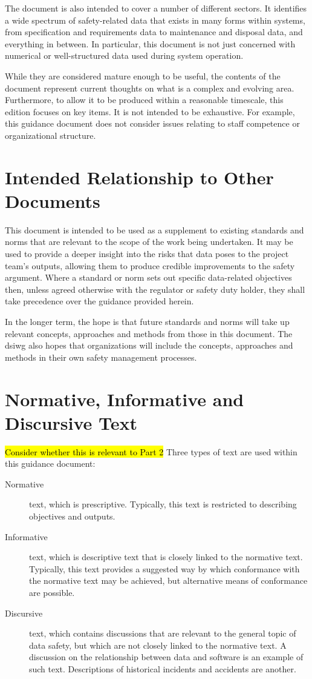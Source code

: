 The document is also intended to cover a number of different sectors. It identifies a wide spectrum of safety-related data that exists in many forms within systems, from specification and requirements data to maintenance and disposal data, and everything in between. In particular, this document is not just concerned with numerical or well-structured data used during system operation.

While they are considered mature enough to be useful, the contents of the document represent current thoughts on what is a complex and evolving area. Furthermore, to allow it to be produced within a reasonable timescale, this edition focuses on key items. It is not intended to be exhaustive. For example, this guidance document does not consider issues relating to staff competence or organizational structure.

\section{Intended Relationship to Other Documents}
This document is intended to be used as a supplement to existing standards and norms that are relevant to the scope of the work being undertaken. It may be used to provide a deeper insight into the risks that data poses to the project team's outputs, allowing them to produce credible improvements to the safety argument. Where a standard or norm sets out specific data-related objectives then, unless agreed otherwise with the regulator or safety duty holder, they shall take precedence over the guidance provided herein.

In the longer term, the hope is that future standards and norms will take up relevant concepts, approaches and methods from those in this document. The \gls{dsiwg} also hopes that organizations will include the concepts, approaches and methods in their own safety management processes.

\clearpage %
\section{Normative, Informative and Discursive Text}\hl{Consider whether this is relevant to Part 2}
Three types of text are used within this guidance document:
\begin{description}
	\item[Normative] text, which is prescriptive. Typically, this text is restricted to describing objectives and outputs.
	\item[Informative] text, which is descriptive text that is closely linked to the normative text. Typically, this text provides a suggested way by which conformance with the normative text may be achieved, but alternative means of conformance are possible.
	\item[Discursive] text, which contains discussions that are relevant to the general topic of data safety, but which are not closely linked to the normative text. A discussion on the relationship between data and software is an example of such text. Descriptions of historical incidents and accidents are another.
\end{description}

